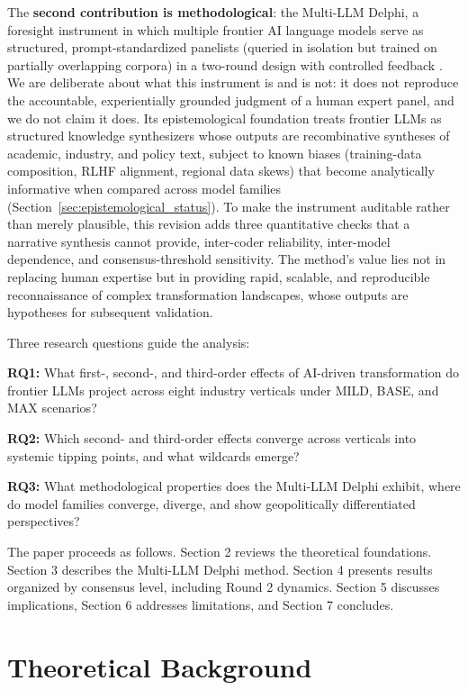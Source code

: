 \documentclass[preprint,review,12pt]{elsarticle}
\begin{document}
The \textbf{second contribution is methodological}: the Multi-LLM Delphi, a foresight instrument in which multiple frontier AI language models serve as structured, prompt-standardized panelists (queried in isolation but trained on partially overlapping corpora) in a two-round design with controlled feedback \citep{linstone1975delphi, gordon2006rtdelphi}. We are deliberate about what this instrument is and is not: it does not reproduce the accountable, experientially grounded judgment of a human expert panel, and we do not claim it does. Its epistemological foundation treats frontier LLMs as structured knowledge synthesizers whose outputs are recombinative syntheses of academic, industry, and policy text, subject to known biases (training-data composition, RLHF alignment, regional data skews) that become analytically informative when compared across model families (Section~\ref{sec:epistemological_status}). To make the instrument auditable rather than merely plausible, this revision adds three quantitative checks that a narrative synthesis cannot provide, inter-coder reliability, inter-model dependence, and consensus-threshold sensitivity. The method's value lies not in replacing human expertise but in providing rapid, scalable, and reproducible reconnaissance of complex transformation landscapes, whose outputs are hypotheses for subsequent validation.

Three research questions guide the analysis:

\textbf{RQ1:} What first-, second-, and third-order effects of AI-driven transformation do frontier LLMs project across eight industry verticals under MILD, BASE, and MAX scenarios?

\textbf{RQ2:} Which second- and third-order effects converge across verticals into systemic tipping points, and what wildcards emerge?

\textbf{RQ3:} What methodological properties does the Multi-LLM Delphi exhibit, where do model families converge, diverge, and show geopolitically differentiated perspectives?

The paper proceeds as follows. Section 2 reviews the theoretical foundations. Section 3 describes the Multi-LLM Delphi method. Section 4 presents results organized by consensus level, including Round 2 dynamics. Section 5 discusses implications, Section 6 addresses limitations, and Section 7 concludes.



\section{Theoretical Background}
\label{sec:theoretical_background}
\end{document}
